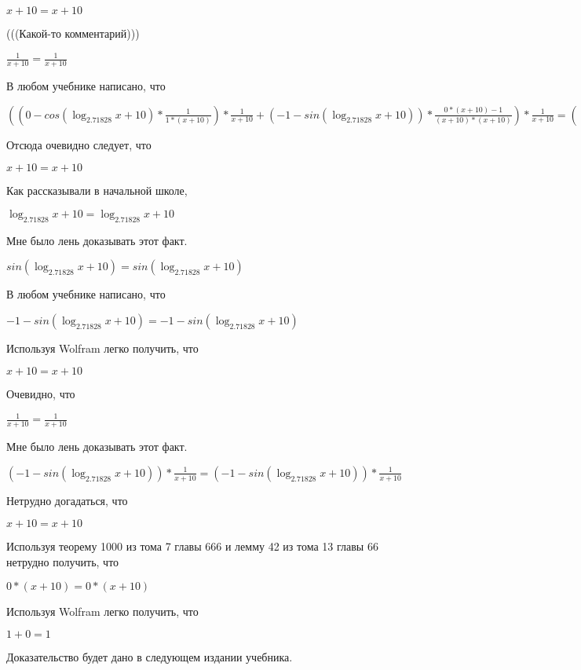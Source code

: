 \documentclass[12pt,a4paper,fleqn]{article}
\theoremstyle{definition}
\begin{document}
$ x  +  10  =  x  +  10 $

(((Какой-то комментарий))) 

$\frac{ 1 }{ x  +  10 }
 = \frac{ 1 }{ x  +  10 }
$

В любом учебнике написано, что 

$(( 0  - cos(\log_{ 2.71828 }{ x  +  10 }) * \frac{ 1 }{ 1  * ( x  +  10 )}
) * \frac{ 1 }{ x  +  10 }
 + ( -1  - sin(\log_{ 2.71828 }{ x  +  10 })) * \frac{ 0  * ( x  +  10 ) -  1 }{( x  +  10 ) * ( x  +  10 )}
) * \frac{ 1 }{ x  +  10 }
 = (( 0  - cos(\log_{ 2.71828 }{ x  +  10 }) * \frac{ 1 }{ 1  * ( x  +  10 )}
) * \frac{ 1 }{ x  +  10 }
 + ( -1  - sin(\log_{ 2.71828 }{ x  +  10 })) * \frac{ 0  * ( x  +  10 ) -  1 }{( x  +  10 ) * ( x  +  10 )}
) * \frac{ 1 }{ x  +  10 }
$

Отсюда очевидно следует, что 

$ x  +  10  =  x  +  10 $

Как рассказывали в начальной школе, 

$\log_{ 2.71828 }{ x  +  10 } = \log_{ 2.71828 }{ x  +  10 }$

Мне было лень доказывать этот факт.

$sin(\log_{ 2.71828 }{ x  +  10 }) = sin(\log_{ 2.71828 }{ x  +  10 })$

В любом учебнике написано, что 

$ -1  - sin(\log_{ 2.71828 }{ x  +  10 }) =  -1  - sin(\log_{ 2.71828 }{ x  +  10 })$

Используя Wolfram легко получить, что 

$ x  +  10  =  x  +  10 $

Очевидно, что 

$\frac{ 1 }{ x  +  10 }
 = \frac{ 1 }{ x  +  10 }
$

Мне было лень доказывать этот факт.

$( -1  - sin(\log_{ 2.71828 }{ x  +  10 })) * \frac{ 1 }{ x  +  10 }
 = ( -1  - sin(\log_{ 2.71828 }{ x  +  10 })) * \frac{ 1 }{ x  +  10 }
$

Нетрудно догадаться, что 

$ x  +  10  =  x  +  10 $

Используя теорему 1000 из тома 7 главы 666 и лемму 42 из тома 13 главы 66 нетрудно получить, что 

$ 0  * ( x  +  10 ) =  0  * ( x  +  10 )$

Используя Wolfram легко получить, что 

$ 1  +  0  =  1 $

Доказательство будет дано в следующем издании учебника. 
\end{document}
